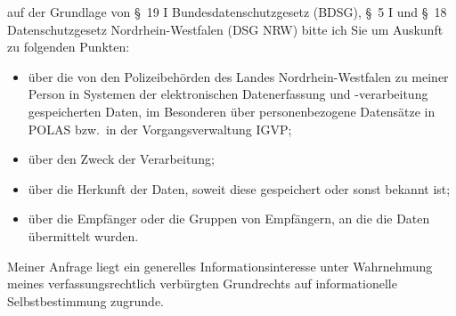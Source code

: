 auf der Grundlage von §~19 I Bundesdatenschutzgesetz (BDSG),
§~5 I und §~18 Datenschutzgesetz Nordrhein-Westfalen (DSG NRW) bitte ich Sie um
Auskunft zu folgenden Punkten:

\begin{itemize}
  \item über die von den Polizeibehörden des Landes Nordrhein-Westfalen zu meiner
  Person in Systemen der elektronischen Datenerfassung und -verarbeitung gespeicherten
  Daten, im Besonderen über personenbezogene Datensätze in POLAS bzw.~in der
  Vorgangsverwaltung IGVP;

  \item über den Zweck der Verarbeitung;

  \item über die Herkunft der Daten, soweit diese gespeichert oder sonst bekannt ist;

  \item über die Empfänger oder die Gruppen von Empfängern, an die die Daten übermittelt wurden.
\end{itemize}

Meiner Anfrage liegt ein generelles Informationsinteresse unter Wahrnehmung
meines verfassungsrechtlich verbürgten Grundrechts auf informationelle
Selbstbestimmung zugrunde.
